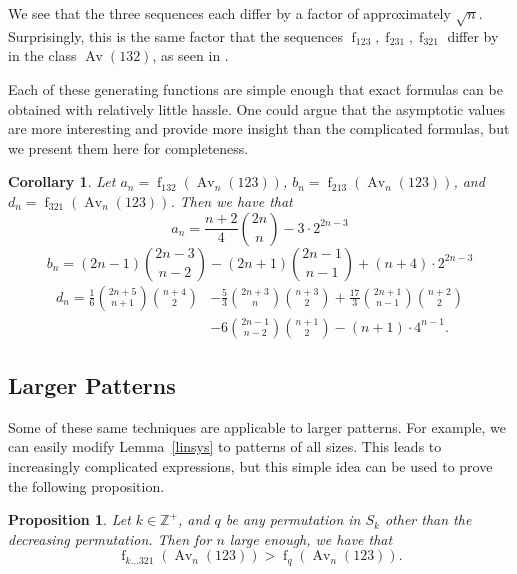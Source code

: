 \documentclass[11pt]{article} %
\theoremstyle{plain}
\newtheorem{corollary}[theorem]{Corollary}
\newtheorem{proposition}[theorem]{Proposition}
\theoremstyle{definition}
\newcommand{\Avn}{\Av_n(123)}
\DeclareMathOperator{\Av}{Av}
\DeclareMathOperator{\num}{f}
\begin{document}
  We see that the three sequences each differ by a factor of
  approximately $\sqrt{n}$. Surprisingly, this is the same factor that
  the sequences $\num_{123}, \num_{231}, \num_{321}$ differ by in the
  class $\Av (132)$, as seen in \cite{bona10}.

  Each of these generating functions are simple enough that exact
  formulas can be obtained with relatively little hassle. One could
  argue that the asymptotic values are more interesting and
  provide more insight than the complicated formulas, but we present
  them here for completeness.

  \begin{corollary}
    Let $a_n = \num_{132}(\Avn)$, $b_n = \num_{213}(\Avn)$, and $d_n =
    \num_{321}(\Avn)$. Then we have that
    $$ a_n = \frac{n+2}{4} \binom{2n}{n} - 3 \cdot 2^{2n-3} $$
    $$ b_n = (2n-1) \binom{2n-3}{n-2} - (2n+1)\binom{2n-1}{n-1} +
       (n+4) \cdot 2^{2n-3}$$
    $$ \begin{aligned} d_n
        = \frac{1}{6} \binom{2n+5}{n+1} \binom{n+4}{2}
        &- \frac{5}{3} \binom{2n+3}{n} \binom{n+3}{2}
        + \frac{17}{3} \binom{2n+1}{n-1} \binom{n+2}{2} \\
        &- 6\binom{2n-1}{n-2} \binom{n+1}{2} - (n+1) \cdot 4^{n-1}.
      \end{aligned}
    $$
  \end{corollary}


\subsection{Larger Patterns}

  Some of these same techniques are applicable to larger patterns.
  For example, we can easily modify Lemma~\ref{linsys} to patterns
  of all sizes. This leads to increasingly complicated expressions,
  but this simple idea can be used to prove the following proposition.

  \begin{proposition}
    Let $k \in \mathbb{Z}^+$, and $q$ be any permutation in $S_k$
    other than the decreasing permutation. Then for $n$ large enough,
    we have that
    $$\num_{k \ldots 3 2 1}(\Avn) > \num_{q}(\Avn).$$
  \end{proposition}
\end{document}
